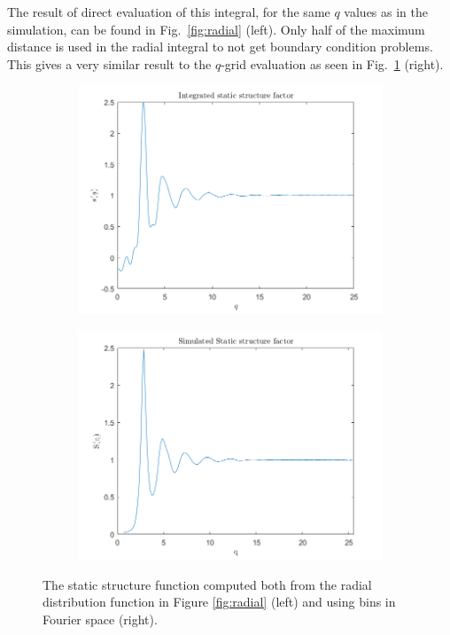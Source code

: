 The result of direct evaluation of this integral, for the same $q$ values as in the simulation, can be found in Fig.~\ref{fig:radial} (left). Only half of the maximum distance is used in the radial integral to not get boundary condition problems. This gives a very similar result to the $q$-grid evaluation as seen in Fig.~\ref{fig:StaticStructure} (right).

\begin{figure}[H]
    \centering
    \captionsetup[subfigure]{justification=centering}
    \begin{subfigure}[b]{0.40\textwidth}
        \centering
        \includegraphics[width=\textwidth]{graphics/task8/integral.png}
    \end{subfigure}
    \begin{subfigure}[b]{0.40\textwidth}
        \centering
        \includegraphics[width=\textwidth]{graphics/task8/simulated.png}
    \end{subfigure}
    \caption{The static structure function computed both from the radial distribution function in Figure \ref{fig:radial} (left) and using bins in Fourier space (right).}
    \label{fig:StaticStructure}
\end{figure}



